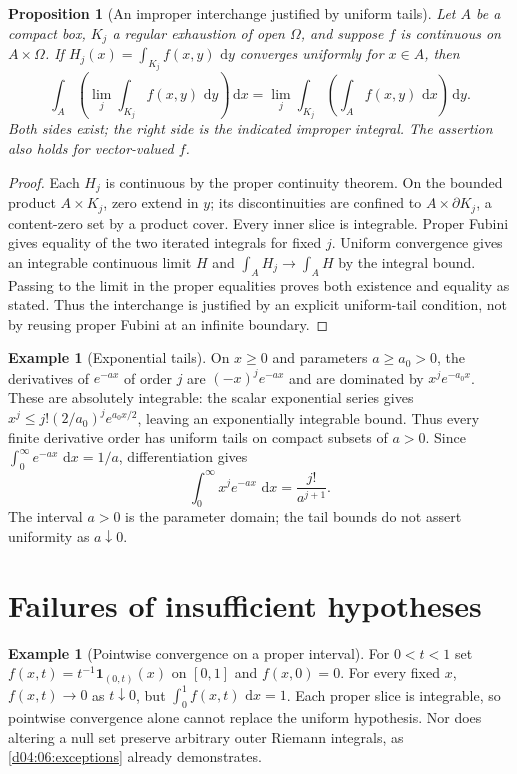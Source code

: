 \documentclass[11pt,oneside,openany]{book}
\newtheorem{proposition}[theorem]{Proposition}
\theoremstyle{definition}
\newtheorem{example}[theorem]{Example}
\theoremstyle{remark}
\newcommand{\dd}{\,\mathrm d}
\newcommand{\family}[1]{}
\begin{document}
\begin{proposition}[An improper interchange justified by uniform tails]\label{d04:08:improper-interchange}
Let $A$ be a compact box, $K_j$ a regular exhaustion of open $\Omega$, and suppose $f$ is continuous on $A\times\Omega$. If $H_j(x)=\int_{K_j}f(x,y)\,\dd y$ converges uniformly for $x\in A$, then
\[
 \int_A\left(\lim_j\int_{K_j}f(x,y)\,\dd y\right)\dd x
 =\lim_j\int_{K_j}\left(\int_Af(x,y)\,\dd x\right)\dd y.
\]
Both sides exist; the right side is the indicated improper integral. The assertion also holds for vector-valued $f$.
\end{proposition}
\begin{proof}
Each $H_j$ is continuous by the proper continuity theorem. On the bounded product $A\times K_j$, zero extend in $y$; its discontinuities are confined to $A\times\partial K_j$, a content-zero set by a product cover. Every inner slice is integrable. Proper Fubini gives equality of the two iterated integrals for fixed $j$. Uniform convergence gives an integrable continuous limit $H$ and $\int_AH_j\to\int_AH$ by the integral bound. Passing to the limit in the proper equalities proves both existence and equality as stated. Thus the interchange is justified by an explicit uniform-tail condition, not by reusing proper Fubini at an infinite boundary.
\end{proof}

\begin{example}[Exponential tails]\label{d04:08:exponential-tail}
On $x\geq0$ and parameters $a\geq a_0>0$, the derivatives of $e^{-ax}$ of order $j$ are $(-x)^je^{-ax}$ and are dominated by $x^je^{-a_0x}$. These are absolutely integrable: the scalar exponential series gives $x^j\leq j!(2/a_0)^j e^{a_0x/2}$, leaving an exponentially integrable bound. Thus every finite derivative order has uniform tails on compact subsets of $a>0$. Since $\int_0^\infty e^{-ax}\,\dd x=1/a$, differentiation gives
\[
 \int_0^\infty x^je^{-ax}\,\dd x=\frac{j!}{a^{j+1}}.
\]
The interval $a>0$ is the parameter domain; the tail bounds do not assert uniformity as $a\downarrow0$.
\end{example}

\family{K04.08.08}
\section{Failures of insufficient hypotheses}
\begin{example}[Pointwise convergence on a proper interval]\label{d04:08:proper-counterexample}
For $0<t<1$ set $f(x,t)=t^{-1}\mathbf1_{(0,t)}(x)$ on $[0,1]$ and $f(x,0)=0$. For every fixed $x$, $f(x,t)\to0$ as $t\downarrow0$, but $\int_0^1f(x,t)\,\dd x=1$. Each proper slice is integrable, so pointwise convergence alone cannot replace the uniform hypothesis. Nor does altering a null set preserve arbitrary outer Riemann integrals, as \cref{d04:06:exceptions} already demonstrates.
\end{example}
\end{document}
